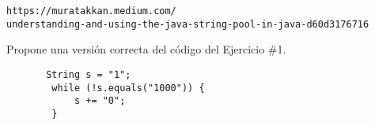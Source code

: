 \documentclass[12pt,letterpaper, onecolumn]{exam}
\begin{document}
\begin{questions}
\begin{solution}
\begin{verbatim}
https://muratakkan.medium.com/
understanding-and-using-the-java-string-pool-in-java-d60d3176716
  \end{verbatim}
    \end{solution}

Propone una versión correcta del código del Ejercicio \#1.

    \begin{solution}
      \begin{verbatim}
       String s = "1";
        while (!s.equals("1000")) {
            s += "0";
        }      \end{verbatim}
    \end{solution}    

\end{questions}
\end{document}
